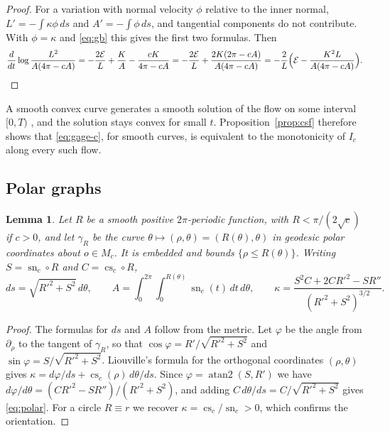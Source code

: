 \documentclass[11pt]{amsart}
\newtheorem{lemma}[theorem]{Lemma}
\theoremstyle{definition}
\theoremstyle{remark}
\numberwithin{equation}{section}
\DeclareMathOperator{\sn}{sn}
\DeclareMathOperator{\cs}{cs}
\newcommand{\E}{\mathcal{E}}
\begin{document}
\begin{proof}
For a variation with normal velocity $\phi$ relative to the inner normal, $L'=-\int\kappa\phi\,ds$ and $A'=-\int\phi\,ds$, and tangential components do not contribute. With $\phi=\kappa$ and \eqref{eq:gb} this gives the first two formulas. Then
\[
\frac{d}{dt}\log\frac{L^2}{A(4\pi-cA)}=-\frac{2\E}{L}+\frac{K}{A}-\frac{cK}{4\pi-cA}
=-\frac{2\E}{L}+\frac{2K(2\pi-cA)}{A(4\pi-cA)}=-\frac2L\Bigl(\E-\frac{K^2L}{A(4\pi-cA)}\Bigr).\qedhere
\]
\end{proof}

A smooth convex curve generates a smooth solution of the flow on some interval $[0,T)$ \cite{Ga90a,Gr89}, and the solution stays convex for small $t$. Proposition~\ref{prop:csf} therefore shows that \eqref{eq:gage-c}, for smooth curves, is equivalent to the monotonicity of $I_c$ along every such flow.

\subsection{Polar graphs}

\begin{lemma}\label{lem:polar}
Let $R$ be a smooth positive $2\pi$-periodic function, with $R<\pi/(2\sqrt c)$ if $c>0$, and let $\gamma_R$ be the curve $\theta\mapsto(\rho,\theta)=(R(\theta),\theta)$ in geodesic polar coordinates about $o\in M_c$. It is embedded and bounds $\{\rho\le R(\theta)\}$. Writing $S=\sn_c\circ R$ and $C=\cs_c\circ R$,
\begin{equation}\label{eq:polar}
ds=\sqrt{R'^2+S^2}\,d\theta,\qquad
A=\int_0^{2\pi}\!\!\int_0^{R(\theta)}\sn_c(t)\,dt\,d\theta,\qquad
\kappa=\frac{S^2C+2CR'^2-SR''}{(R'^2+S^2)^{3/2}} .
\end{equation}
\end{lemma}

\begin{proof}
The formulas for $ds$ and $A$ follow from the metric. Let $\varphi$ be the angle from $\partial_\rho$ to the tangent of $\gamma_R$, so that $\cos\varphi=R'/\sqrt{R'^2+S^2}$ and $\sin\varphi=S/\sqrt{R'^2+S^2}$. Liouville's formula for the orthogonal coordinates $(\rho,\theta)$ \cite[\S4-4]{dC76} gives $\kappa=d\varphi/ds+\cs_c(\rho)\,d\theta/ds$. Since $\varphi=\operatorname{atan2}(S,R')$ we have $d\varphi/d\theta=(CR'^2-SR'')/(R'^2+S^2)$, and adding $C\,d\theta/ds=C/\sqrt{R'^2+S^2}$ gives \eqref{eq:polar}. For a circle $R\equiv r$ we recover $\kappa=\cs_c/\sn_c>0$, which confirms the orientation.
\end{proof}
\end{document}
